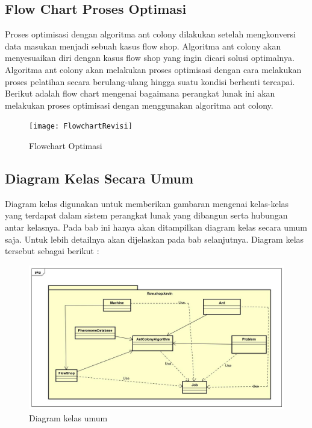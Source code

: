 	
	\subsection{Flow Chart Proses Optimasi}
	
	Proses optimisasi dengan algoritma ant colony dilakukan setelah mengkonversi data masukan menjadi
	sebuah kasus flow shop. Algoritma ant colony akan menyesuaikan diri dengan kasus flow shop yang ingin 
	dicari solusi optimalnya. Algoritma ant colony akan melakukan proses optimisasi dengan cara melakukan 
	proses pelatihan secara berulang-ulang hingga suatu kondisi berhenti tercapai. Berikut adalah flow chart 
	mengenai bagaimana perangkat lunak ini akan melakukan proses optimisasi dengan menggunakan algoritma ant colony.
	\begin{figure}[H]
		\centering
		\texttt{[image: FlowchartRevisi]}
		\caption[Flowchart]{Flowchart Optimasi}
		\label{fig:flowchartoptimasi}
	\end{figure}
	
	
	\subsection{Diagram Kelas Secara Umum}
	
	Diagram kelas digunakan untuk memberikan gambaran mengenai kelas-kelas yang terdapat dalam
	sistem perangkat lunak yang dibangun serta hubungan antar kelasnya. Pada bab ini hanya akan ditampilkan
	diagram kelas secara umum saja. Untuk lebih detailnya akan dijelaskan pada bab selanjutnya. Diagram kelas
	tersebut sebagai berikut : 
		\begin{figure}[H]
		\centering
		\includegraphics[scale=0.40]{ClassDiagramUmumRev}
		\caption[Diagram kelas umum]{Diagram kelas umum}
		\label{fig:diagramkelasumum}
	\end{figure}

